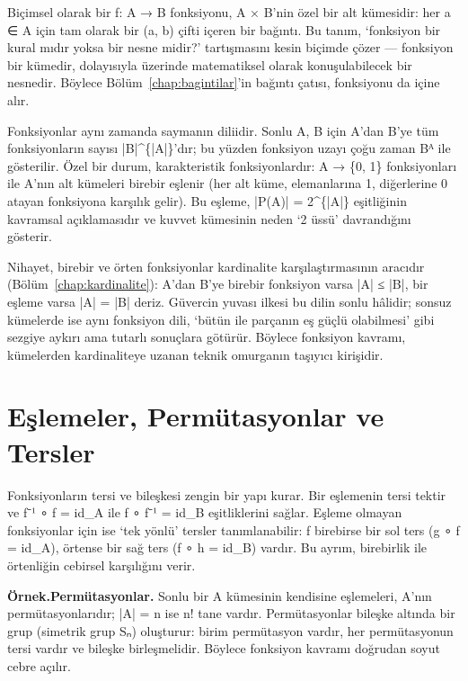 Biçimsel olarak bir f: A → B fonksiyonu, A × B’nin özel bir alt kümesidir: her a ∈ A için tam olarak bir (a, b) çifti içeren bir bağıntı. Bu tanım, ‘fonksiyon bir kural mıdır yoksa bir nesne midir?’ tartışmasını kesin biçimde çözer — fonksiyon bir kümedir, dolayısıyla üzerinde matematiksel olarak konuşulabilecek bir nesnedir. Böylece Bölüm~\ref{chap:bagintilar}’in bağıntı çatısı, fonksiyonu da içine alır.

Fonksiyonlar aynı zamanda saymanın diliidir. Sonlu A, B için A’dan B’ye tüm fonksiyonların sayısı |B|\textasciicircum{}\{|A|\}’dır; bu yüzden fonksiyon uzayı çoğu zaman Bᴬ ile gösterilir. Özel bir durum, karakteristik fonksiyonlardır: A → \{0, 1\} fonksiyonları ile A’nın alt kümeleri birebir eşlenir (her alt küme, elemanlarına 1, diğerlerine 0 atayan fonksiyona karşılık gelir). Bu eşleme, |P(A)| = 2\textasciicircum{}\{|A|\} eşitliğinin kavramsal açıklamasıdır ve kuvvet kümesinin neden ‘2 üssü’ davrandığını gösterir.

Nihayet, birebir ve örten fonksiyonlar kardinalite karşılaştırmasının aracıdır (Bölüm~\ref{chap:kardinalite}): A’dan B’ye birebir fonksiyon varsa |A| ≤ |B|, bir eşleme varsa |A| = |B| deriz. Güvercin yuvası ilkesi bu dilin sonlu hâlidir; sonsuz kümelerde ise aynı fonksiyon dili, ‘bütün ile parçanın eş güçlü olabilmesi’ gibi sezgiye aykırı ama tutarlı sonuçlara götürür. Böylece fonksiyon kavramı, kümelerden kardinaliteye uzanan teknik omurganın taşıyıcı kirişidir.

\section{Eşlemeler, Permütasyonlar ve Tersler}

Fonksiyonların tersi ve bileşkesi zengin bir yapı kurar. Bir eşlemenin tersi tektir ve f⁻¹ ∘ f = id\_A ile f ∘ f⁻¹ = id\_B eşitliklerini sağlar. Eşleme olmayan fonksiyonlar için ise ‘tek yönlü’ tersler tanımlanabilir: f birebirse bir sol ters (g ∘ f = id\_A), örtense bir sağ ters (f ∘ h = id\_B) vardır. Bu ayrım, birebirlik ile örtenliğin cebirsel karşılığını verir.

\begin{tcolorbox}[bookbox,colback=cEx]\textbf{\textsf{\textcolor{cAcc}{Örnek.}}}\quad \textbf{Permütasyonlar. }Sonlu bir A kümesinin kendisine eşlemeleri, A’nın permütasyonlarıdır; |A| = n ise n! tane vardır. Permütasyonlar bileşke altında bir grup (simetrik grup Sₙ) oluşturur: birim permütasyon vardır, her permütasyonun tersi vardır ve bileşke birleşmelidir. Böylece fonksiyon kavramı doğrudan soyut cebre açılır.\end{tcolorbox}


